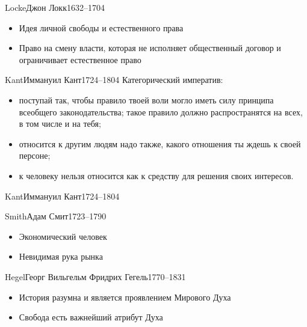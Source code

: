 \documentclass[aspectratio=169]{beamer}
\begin{document}
\begin{Person}{Locke}{Джон Локк}{1632--1704}
\begin{itemize}
\item Идея личной свободы и естественного права
\item Право на смену власти, которая не исполняет общественный договор и ограничивает естественное право 
\end{itemize}
\end{Person}

\begin{Person}{Kant}{Иммануил Кант}{1724--1804}
Категорический императив:
\begin{itemize}
\item поступай так, чтобы правило твоей воли могло иметь силу принципа всеобщего законодательства; такое правило должно распространятся на всех, в том числе и на тебя;
\item относится к другим людям надо также, какого отношения ты ждешь к своей персоне;
\item к человеку нельзя относится как к средству для решения своих интересов.
\end{itemize}
\end{Person}


\begin{Person}{Kant}{Иммануил Кант}{1724--1804}
\end{Person}



\begin{Person}{Smith}{Адам Смит}{1723--1790}

\begin{itemize}
\item Экономический человек
\item Невидимая рука рынка
\end{itemize}

\end{Person}

\begin{Person}{Hegel}{Георг Вильгельм Фридрих Гегель}{1770--1831}

\begin{itemize}
\item История разумна и является проявлением Мирового Духа
\item Свобода есть важнейший атрибут Духа
\end{itemize}
\end{Person}
\end{document}
